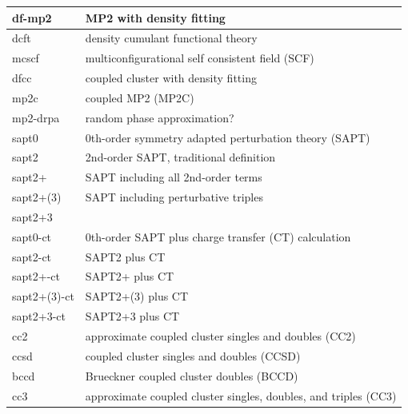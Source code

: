 \documentclass[letterpaper,10pt,english]{sphinxmanual}
\begin{document}
\begin{fulllineitems}
\begin{longtable}{|l|l|}
df-mp2
 & 
MP2 with density fitting
\\\hline

dcft
 & 
density cumulant functional theory
\\\hline

mcscf
 & 
multiconfigurational self consistent field (SCF)
\\\hline

dfcc
 & 
coupled cluster with density fitting
\\\hline

mp2c
 & 
coupled MP2 (MP2C)
\\\hline

mp2-drpa
 & 
random phase approximation?
\\\hline

sapt0
 & 
0th-order symmetry adapted perturbation theory (SAPT)
\\\hline

sapt2
 & 
2nd-order SAPT, traditional definition
\\\hline

sapt2+
 & 
SAPT including all 2nd-order terms
\\\hline

sapt2+(3)
 & 
SAPT including perturbative triples
\\\hline

sapt2+3
 & \\\hline

sapt0-ct
 & 
0th-order SAPT plus charge transfer (CT) calculation
\\\hline

sapt2-ct
 & 
SAPT2 plus CT
\\\hline

sapt2+-ct
 & 
SAPT2+ plus CT
\\\hline

sapt2+(3)-ct
 & 
SAPT2+(3) plus CT
\\\hline

sapt2+3-ct
 & 
SAPT2+3 plus CT
\\\hline

cc2
 & 
approximate coupled cluster singles and doubles (CC2)
\\\hline

ccsd
 & 
coupled cluster singles and doubles (CCSD)
\\\hline

bccd
 & 
Brueckner coupled cluster doubles (BCCD)
\\\hline

cc3
 & 
approximate coupled cluster singles, doubles, and triples (CC3)
\\\hline


\end{longtable}
\end{fulllineitems}
\end{document}
